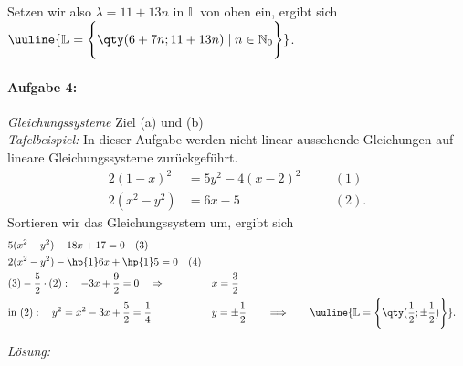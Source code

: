 Setzen wir also $\lambda = 11+13n$ in $\mathbb{L}$ von oben ein, ergibt sich $\uuline{\mathbb{L} = \Bigg\{\qty(6+7n;11+13n)\mid n \in\mathbb{N}_0\Bigg\}}$.

\paragraph{Aufgabe 4: } \emph{Gleichungssysteme} \hfill Ziel (a) und (b)\\[0.2cm]

\emph{Tafelbeispiel:} In dieser Aufgabe werden nicht linear aussehende Gleichungen auf lineare Gleichungssysteme zurückgeführt. 
\begin{alignat*}{2}
    (1-x)^2 &= 5y^2 - 4(x-2)^2 \quad &&(1) \\
    2(x^2-y^2) &= 6x-5 &&(2).
\end{alignat*}
Sortieren wir das Gleichungssystem um, ergibt sich 
\begin{alignat*}{2}
    &5(x^2-y^2)-18x + 17 = 0 \quad (3)\\
    &2(x^2-y^2)-\hp{1}6x + \hp{1}5 = 0 \quad (4)\\
    &(3)-\frac{5}{2}\cdot(2): \quad -3x + \frac{9}{2} = 0 \quad\Rightarrow \quad &&x=\frac{3}{2} \\
    &\text{in }(2): \quad y^2 =x^2 -3x + \frac{5}{2} = \frac{1}{4} \quad &&y= \pm \frac{1}{2} \qquad \Longrightarrow \qquad \uuline{\mathbb{L} = \Bigg\{\qty(\frac{1}{2};\pm \frac{1}{2})\Bigg\}}. 
\end{alignat*}

\emph{Lösung:}

